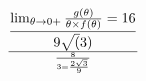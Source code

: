 \documentclass[preview]{standalone}
\begin{document}
\begin{align*}
\lim_{\theta \to 0 +} {g( \theta ) \over {\theta \times f( \theta )}} =  16 \over 9\sqrt(3)} \over {8 \over 3  = {2\sqrt{3} \over 9}
\end{align*}
\end{document}

